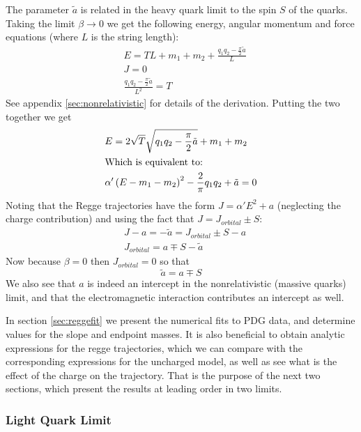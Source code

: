 \documentclass[11pt,a4paper]{article}
\begin{document}
The parameter $\tilde{a}$ is related in the heavy quark limit to the spin $S$ of the quarks. Taking the limit $\beta\rightarrow0$ we get the following energy, angular momentum and force equations (where $L$ is the string length):
\begin{subequations}
\label{eq:nonrelativistic}
\begin{align}
&E=TL+m_{1}+m_{2}+\frac{q_1q_2-\frac{\pi}{2}\tilde{a}}{L}\\ 
&J=0\\
&\frac{q_1q_2-\frac{\pi}{2}\tilde{a}}{L^{2}}=T
\end{align}
\end{subequations}
See appendix \ref{sec:nonrelativistic} for details of the derivation.
Putting the two together we get
\begin{subequations}
\begin{align}
&E=2\sqrt{T}\sqrt{q_1q_2-\frac{\pi}{2}\tilde{a}}+m_1+m_2\label{eq:nonrelativistic2}\\
&\text{Which is equivalent to:}\notag\\
&\alpha'\left(E-m_{1}-m_{2}\right)^{2}-\frac{2}{\pi}q_1q_2+\tilde{a}=0
\end{align}
\end{subequations} 
Noting that the Regge trajectories have the form $J=\alpha'E^2+a$ (neglecting the charge contribution) and using the fact that $J=J_{orbital}\pm S$:
\begin{align}
&J-a=-\tilde{a}=J_{orbital}\pm S-a\\
&J_{orbital}=a\mp S-\tilde{a}
\end{align}
Now because $\beta=0$ then $J_{orbital}=0$ so that
\begin{equation}
\label{eq:atilde}
\tilde{a}=a\mp S
\end{equation}
We also see that $a$ is indeed an intercept in the nonrelativistic (massive quarks) limit, and that the electromagnetic interaction contributes an intercept as well.

In section \ref{sec:reggefit} we present the numerical fits to PDG data, and determine values for the slope and endpoint masses. It is also beneficial to obtain analytic expressions for the regge trajectories, which we can compare with the corresponding expressions for the uncharged model, as well as see what is the effect of the charge on the trajectory. That is the purpose of the next two sections, which present the results at leading order in two limits.
\FloatBarrier 
\subsubsection{Light Quark Limit}
\end{document}
